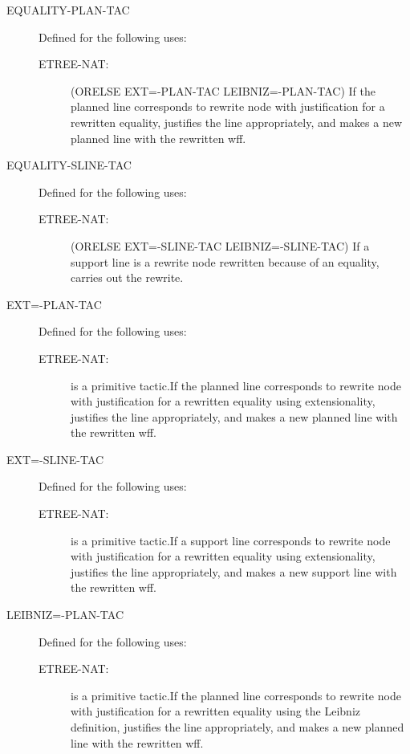 \begin{description} 
\item[EQUALITY-PLAN-TAC]  Defined for the following uses:
\begin{description}
\item[ETREE-NAT:] 
(ORELSE EXT=-PLAN-TAC LEIBNIZ=-PLAN-TAC)
If the planned line corresponds to rewrite node with justification
for a rewritten equality, justifies the line appropriately,
and makes a new planned line with the rewritten wff.

\end{description}

\item[EQUALITY-SLINE-TAC]  Defined for the following uses:
\begin{description}
\item[ETREE-NAT:] 
(ORELSE EXT=-SLINE-TAC LEIBNIZ=-SLINE-TAC)
If a support line is a rewrite node rewritten because of an equality,
carries out the rewrite.

\end{description}

\item[EXT=-PLAN-TAC]  Defined for the following uses:
\begin{description}
\item[ETREE-NAT:]  is a primitive tactic.If the planned line corresponds to rewrite node with justification
for a rewritten equality using extensionality, justifies the line 
appropriately, and makes a new planned line with the rewritten wff.

\end{description}

\item[EXT=-SLINE-TAC]  Defined for the following uses:
\begin{description}
\item[ETREE-NAT:]  is a primitive tactic.If a support line corresponds to rewrite node with justification
for a rewritten equality using extensionality, justifies the line 
appropriately, and makes a new support line with the rewritten wff.

\end{description}

\item[LEIBNIZ=-PLAN-TAC]  Defined for the following uses:
\begin{description}
\item[ETREE-NAT:]  is a primitive tactic.If the planned line corresponds to rewrite node with justification
for a rewritten equality using the Leibniz definition, justifies the line 
appropriately, and makes a new planned line with the rewritten wff.


\end{description}
\end{description}
